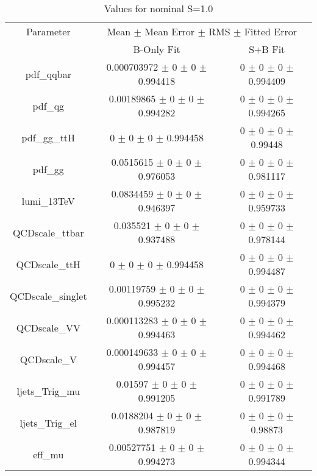 \begin{table}
\centering
\caption{Values for nominal S=1.0}
\begin{tabular}{ccc}
\toprule
Parameter 	& \multicolumn{2}{c}{Mean $\pm$ Mean Error $\pm$ RMS $\pm$ Fitted Error}\\
 	& B-Only Fit & S+B Fit\\
\midrule
pdf\_qqbar 	& \num{0.000703972} $\pm$ \num{0} $\pm$ \num{0} $\pm$ \num{0.994418} 	& \num{0} $\pm$ \num{0} $\pm$ \num{0} $\pm$ \num{0.994409}\\
pdf\_qg 	& \num{0.00189865} $\pm$ \num{0} $\pm$ \num{0} $\pm$ \num{0.994282} 	& \num{0} $\pm$ \num{0} $\pm$ \num{0} $\pm$ \num{0.994265}\\
pdf\_gg\_ttH 	& \num{0} $\pm$ \num{0} $\pm$ \num{0} $\pm$ \num{0.994458} 	& \num{0} $\pm$ \num{0} $\pm$ \num{0} $\pm$ \num{0.99448}\\
pdf\_gg 	& \num{0.0515615} $\pm$ \num{0} $\pm$ \num{0} $\pm$ \num{0.976053} 	& \num{0} $\pm$ \num{0} $\pm$ \num{0} $\pm$ \num{0.981117}\\
lumi\_13TeV 	& \num{0.0834459} $\pm$ \num{0} $\pm$ \num{0} $\pm$ \num{0.946397} 	& \num{0} $\pm$ \num{0} $\pm$ \num{0} $\pm$ \num{0.959733}\\
QCDscale\_ttbar 	& \num{0.035521} $\pm$ \num{0} $\pm$ \num{0} $\pm$ \num{0.937488} 	& \num{0} $\pm$ \num{0} $\pm$ \num{0} $\pm$ \num{0.978144}\\
QCDscale\_ttH 	& \num{0} $\pm$ \num{0} $\pm$ \num{0} $\pm$ \num{0.994458} 	& \num{0} $\pm$ \num{0} $\pm$ \num{0} $\pm$ \num{0.994487}\\
QCDscale\_singlet 	& \num{0.00119759} $\pm$ \num{0} $\pm$ \num{0} $\pm$ \num{0.995232} 	& \num{0} $\pm$ \num{0} $\pm$ \num{0} $\pm$ \num{0.994379}\\
QCDscale\_VV 	& \num{0.000113283} $\pm$ \num{0} $\pm$ \num{0} $\pm$ \num{0.994463} 	& \num{0} $\pm$ \num{0} $\pm$ \num{0} $\pm$ \num{0.994462}\\
QCDscale\_V 	& \num{0.000149633} $\pm$ \num{0} $\pm$ \num{0} $\pm$ \num{0.994457} 	& \num{0} $\pm$ \num{0} $\pm$ \num{0} $\pm$ \num{0.994468}\\
ljets\_Trig\_mu 	& \num{0.01597} $\pm$ \num{0} $\pm$ \num{0} $\pm$ \num{0.991205} 	& \num{0} $\pm$ \num{0} $\pm$ \num{0} $\pm$ \num{0.991789}\\
ljets\_Trig\_el 	& \num{0.0188204} $\pm$ \num{0} $\pm$ \num{0} $\pm$ \num{0.987819} 	& \num{0} $\pm$ \num{0} $\pm$ \num{0} $\pm$ \num{0.98873}\\
eff\_mu 	& \num{0.00527751} $\pm$ \num{0} $\pm$ \num{0} $\pm$ \num{0.994273} 	& \num{0} $\pm$ \num{0} $\pm$ \num{0} $\pm$ \num{0.994344}\\

\end{tabular}
\end{table}
